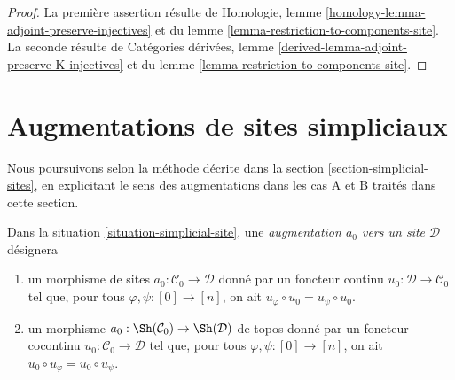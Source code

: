 \begin{proof}
La première assertion résulte de
Homologie, lemme \ref{homology-lemma-adjoint-preserve-injectives}
et du
lemme \ref{lemma-restriction-to-components-site}.
La seconde résulte de
Catégories dérivées, lemme \ref{derived-lemma-adjoint-preserve-K-injectives}
et du
lemme \ref{lemma-restriction-to-components-site}.
\end{proof}







\section{Augmentations de sites simpliciaux}
\label{section-augmentation-simplicial-sites}

\noindent
Nous poursuivons selon la méthode décrite dans la
section \ref{section-simplicial-sites},
en explicitant le sens des augmentations dans les cas A et B
traités dans cette section.

\begin{remark}
\label{remark-augmentation-site}
Dans la situation \ref{situation-simplicial-site}, une
{\it augmentation $a_0$ vers un site $\mathcal{D}$} désignera
\begin{enumerate}
\item[(A)] un morphisme de sites $a_0 : \mathcal{C}_0 \to \mathcal{D}$
donné par un foncteur continu $u_0 : \mathcal{D} \to \mathcal{C}_0$
tel que, pour tous $\varphi, \psi : [0] \to [n]$, on ait
$u_\varphi \circ u_0 = u_\psi \circ u_0$.
\item[(B)] un morphisme $a_0 : \Sh(\mathcal{C}_0) \to \Sh(\mathcal{D})$
de topos donné par un foncteur cocontinu $u_0 : \mathcal{C}_0 \to \mathcal{D}$
tel que, pour tous $\varphi, \psi : [0] \to [n]$, on ait
$u_0 \circ u_\varphi = u_0 \circ u_\psi$.
\end{enumerate}
\end{remark}

